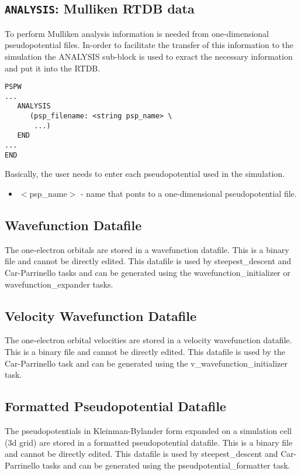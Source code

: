 \subsection{{\tt ANALYSIS}: Mulliken RTDB data}
\label{sec:pspw_analysis}

To perform Mulliken analysis information is needed from one-dimensional
pseudopotential files.  In-order to facilitate the transfer of this information
to the simulation the ANALYSIS sub-block is used to exract the necessary information
and put it into the RTDB.
\begin{verbatim}
PSPW
...
   ANALYSIS
      (psp_filename: <string psp_name> \
       ...)
   END
...
END
\end{verbatim}
Basically, the user needs to enter each pseudopotential used in the simulation.
\begin{itemize}
        \item $<$psp\_name$>$ - name that ponts to a one-dimensional pseudopotential file.
\end{itemize}


\subsection{Wavefunction Datafile}
The one-electron orbitals are stored in a wavefunction datafile.  This
is a binary file and cannot be directly edited.  This datafile is used
by steepest\_descent and Car-Parrinello tasks and can be generated
using the wavefunction\_initializer or wavefunction\_expander tasks.

\subsection{Velocity Wavefunction Datafile}
The one-electron orbital velocities are stored in a velocity wavefunction 
datafile.  This is a binary file and cannot be directly edited.  This datafile 
is used by the Car-Parrinello task and can be generated
using the v\_wavefunction\_initializer task.

\subsection{Formatted Pseudopotential Datafile}
The pseudopotentials in Kleinman-Bylander form expanded on a simulation
cell (3d grid) are stored in a formatted pseudopotential datafile.
This is a binary file and cannot be directly edited.
This datafile 
is used by steepest\_descent and Car-Parrinello tasks and can be generated
using the pseudpotential\_formatter task.

